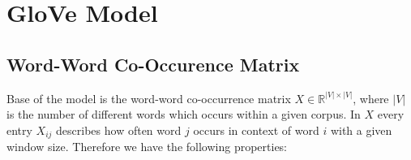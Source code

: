 \chapter{GloVe Model}\label{ch:glove}

%

\section{Word-Word Co-Occurence Matrix}

Base of the model is the word-word co-occurrence matrix 
$X \in \mathbb{R}^{|V| \times |V|}$, where $|V|$ is the number of different 
words which occurs within a given corpus. In $X$ every entry
$X_{ij}$ describes how often word $j$ occurs in context of word $i$ with a given
window size. Therefore we have the following properties:

